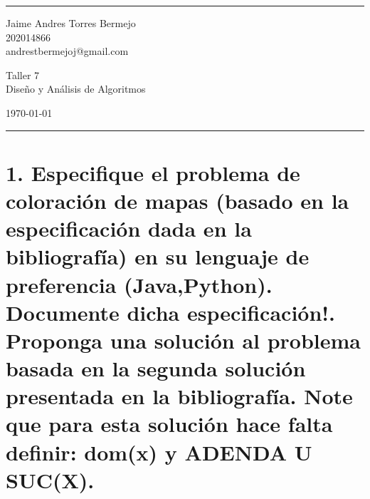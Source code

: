 \documentclass[a4paper]{article}
\begin{document}

\fancyhead[C]{}
\hrule \medskip %
\begin{minipage}{0.295\textwidth} 
\raggedright
\footnotesize
Jaime Andres Torres Bermejo \hfill\\   
202014866\hfill\\
andrestbermejoj@gmail.com
\end{minipage}
\begin{minipage}{0.4\textwidth} 
\centering 
\large 
Taller 7\\ 
\normalsize 
Diseño y Análisis de Algoritmos\\ 
\end{minipage}
\begin{minipage}{0.295\textwidth} 
\raggedleft
\today\hfill\\
\end{minipage}
\medskip\hrule 
\bigskip


\section{1. Especifique el problema de coloración de mapas (basado en la especificación dada
en la bibliografía) en su lenguaje de preferencia (Java,Python). Documente
dicha especificación!. Proponga una solución al problema basada en la segunda
solución presentada en la bibliografía. Note que para esta solución hace falta
definir: dom(x) y ADENDA U SUC(X).}
\end{document}

